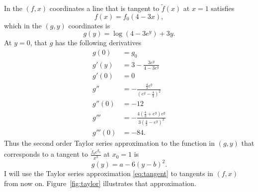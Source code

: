 \documentclass[twocolumn]{article}
\begin{document}
In the $(f,x)$ coordinates a line that is tangent to $\tilde f(x)$ at
$x=1$ satisfies
\begin{equation*}
  f(x) = f_0(4-3x),
\end{equation*}
which in the $(g,y)$ coordinates is
\begin{equation*}
  g(y) = \log \left( 4 - 3e^y \right) + 3y.
\end{equation*}
At $y=0$, that $g$ has the following derivatives
\begin{align*}
  g(0) & = g_0 \\
  g'(y) &= 3 - \frac{3e^y}{4-3e^y} \\
  g'(0) &= 0 \\
  g'' &= -\frac{\frac{4}{3}e^y}{\left( e^y - \frac{4}{3} \right)^2}\\
  g''(0) &= -12 \\
  g''' &= -\frac{4\left( \frac{4}{3} + e^y \right) e^y}{
    3\left( \frac{4}{3} - e^y \right) ^3} \\
  g'''(0) &= -84.
\end{align*}
Thus the second order Taylor series approximation to the function in
$(g,y)$ that corresponds to a tangent to $\frac{\tilde f_0
  e^{g_0}}{x^3}$ at $x_0 = 1$ is
\begin{equation}
  \label{eq:tangent}
  g(y) = a - 6(y-b)^2.
\end{equation}
I will use the Taylor series approximation \eqref{eq:tangent} to
tangents in $(f,x)$ from now on.  Figure~\ref{fig:taylor} illustrates
that approximation.
\end{document}

